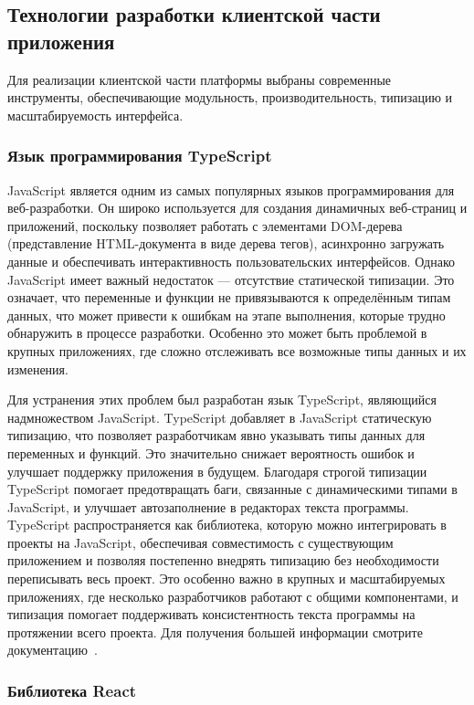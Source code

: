 \subsection{Технологии разработки клиентской части приложения}

Для реализации клиентской части платформы выбраны современные инструменты, обеспечивающие модульность, производительность, типизацию и масштабируемость интерфейса.

\subsubsection{Язык программирования TypeScript}

JavaScript является одним из самых популярных языков программирования для веб-разработки. Он широко используется для создания динамичных веб-страниц и приложений, поскольку позволяет работать с элементами DOM-дерева (представление HTML-документа в виде дерева тегов), асинхронно загружать данные и обеспечивать интерактивность пользовательских интерфейсов. Однако JavaScript имеет важный недостаток — отсутствие статической типизации. Это означает, что переменные и функции не привязываются к определённым типам данных, что может привести к ошибкам на этапе выполнения, которые трудно обнаружить в процессе разработки. Особенно это может быть проблемой в крупных приложениях, где сложно отслеживать все возможные типы данных и их изменения.

Для устранения этих проблем был разработан язык TypeScript, являющийся надмножеством JavaScript. TypeScript добавляет в JavaScript статическую типизацию, что позволяет разработчикам явно указывать типы данных для переменных и функций. Это значительно снижает вероятность ошибок и улучшает поддержку приложения в будущем. Благодаря строгой типизации TypeScript помогает предотвращать баги, связанные с динамическими типами в JavaScript, и улучшает автозаполнение в редакторах текста программы. TypeScript распространяется как библиотека, которую можно интегрировать в проекты на JavaScript, обеспечивая совместимость с существующим приложением и позволяя постепенно внедрять типизацию без необходимости переписывать весь проект. Это особенно важно в крупных и масштабируемых приложениях, где несколько разработчиков работают с общими компонентами, и типизация помогает поддерживать консистентность текста программы на протяжении всего проекта. Для получения большей информации смотрите документацию~\cite{typescript_handbook}.

\subsubsection{Библиотека React}

